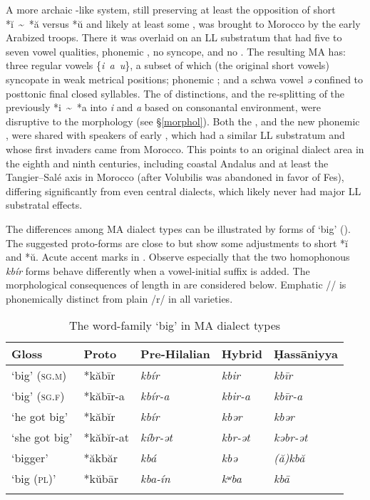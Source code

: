 \documentclass[output=paper]{langsci/langscibook}
\begin{document}
A more archaic -like system, still preserving at least the opposition of short *ĭ~{\textasciitilde}~*ă versus *ŭ and likely at least some , was brought to Morocco by the early Arabized  troops. There it was overlaid on an LL substratum that had five to seven vowel qualities, phonemic , no syncope, and no . The resulting  MA has: three regular vowels \{\textit{i~a~u}\}, a subset of which (the original short vowels) syncopate in weak metrical positions; phonemic ; and a schwa vowel \textit{ə} confined to posttonic final closed syllables. The  of  distinctions, and the re-splitting of the previously  *i~{\textasciitilde}~*a into \textit{i} and \textit{a} based on consonantal environment, were disruptive to the morphology (see §\ref{morphol}). Both the , and the new phonemic , were shared with speakers of early  , which had a similar LL substratum and whose first invaders came from Morocco. This points to an original dialect area in the eighth and ninth centuries, including coastal Andalus and at least the Tangier–Salé axis in Morocco (after Volubilis was abandoned in favor of Fes), differing significantly from even  central  dialects, which likely never had major LL substratal effects. 

The differences among MA dialect types can be illustrated by forms of ‘big’ (). The suggested proto-forms are close to  but show some adjustments to short *ĭ and *ŭ. Acute accent marks  in . Observe especially that the two homophonous  \textit{kbír} forms behave differently when a vowel-initial suffix is added. The morphological consequences of length  in  are considered below. Emphatic /{\R}/ is phonemically distinct from plain /r/ in all varieties. 

\begin{table}
\caption{\label{tab:heath:1}\label{bkm:Ref13483830}The word-family `big' in MA dialect types}
\begin{tabular}{*{5}{l}}
\lsptoprule
{Gloss} & {\normalfont Proto} & {\normalfont Pre-Hilalian} & {\normalfont Hybrid} & {\normalfont Ḥassāniyya}\\\midrule
‘big’ (\textsc{sg.m}) & *kăbīr & \textit{kbír} & \textit{kbir} & \textit{kbīr}\\
‘big’ (\textsc{sg.f}) & *kăbīr-a & \textit{kbír-a} & \textit{kbir-a} & \textit{kbīr-a}\\
‘he got big’ & *kăbĭr & \textit{kbír} & \textit{kbər} & \textit{kbər}\\
‘she got big’ & *kăbĭr-at & \textit{kíbr-ət} & \textit{kbr-ət} & \textit{kəbr-ət}\\
‘bigger’ & *ăkbăr & \textit{kbá{\R}} & \textit{kbə{\R}} & \textit{(ă)kbă{\R}}\\
‘big (\textsc{pl})’ & *kŭbār & \textit{kba{\R}-ín} & \textit{kʷba{\R}} & \textit{kbā{\R}}\\
\lspbottomrule
\end{tabular}
\end{table}
\end{document}
